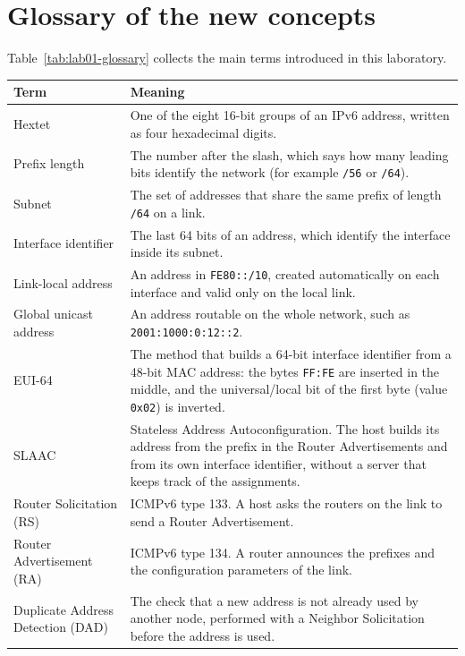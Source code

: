 \section{Glossary of the new concepts}
\label{sec:lab01-glossary}

Table~\ref{tab:lab01-glossary} collects the main terms introduced in this laboratory.

\begin{table}[h]
\centering
\begin{tabular}{@{}p{4.2cm}p{11cm}@{}}
\toprule
\textbf{Term} & \textbf{Meaning} \\
\midrule
Hextet & One of the eight 16-bit groups of an IPv6 address, written as four hexadecimal digits. \\
Prefix length & The number after the slash, which says how many leading bits identify the network (for example \texttt{/56} or \texttt{/64}). \\
Subnet & The set of addresses that share the same prefix of length \texttt{/64} on a link. \\
Interface identifier & The last 64 bits of an address, which identify the interface inside its subnet. \\
Link-local address & An address in \texttt{FE80::/10}, created automatically on each interface and valid only on the local link. \\
Global unicast address & An address routable on the whole network, such as \texttt{2001:1000:0:12::2}. \\
EUI-64 & The method that builds a 64-bit interface identifier from a 48-bit MAC address: the bytes \texttt{FF:FE} are inserted in the middle, and the universal/local bit of the first byte (value \texttt{0x02}) is inverted. \\
SLAAC & Stateless Address Autoconfiguration. The host builds its address from the prefix in the Router Advertisements and from its own interface identifier, without a server that keeps track of the assignments. \\
Router Solicitation (RS) & ICMPv6 type 133. A host asks the routers on the link to send a Router Advertisement. \\
Router Advertisement (RA) & ICMPv6 type 134. A router announces the prefixes and the configuration parameters of the link. \\
Duplicate Address Detection (DAD) & The check that a new address is not already used by another node, performed with a Neighbor Solicitation before the address is used. \\

\end{tabular}
\end{table}
